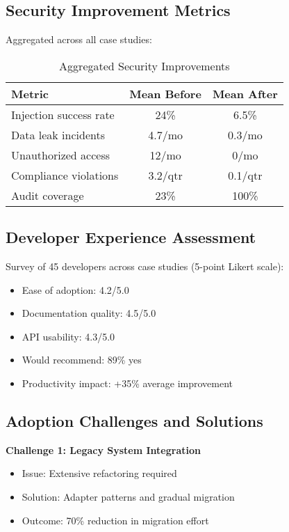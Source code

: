 \subsection{Security Improvement Metrics}

Aggregated across all case studies:

\begin{table}[h]
\centering
\caption{Aggregated Security Improvements}
\begin{tabular}{@{}lcc@{}}
\toprule
\textbf{Metric} & \textbf{Mean Before} & \textbf{Mean After} \\ \midrule
Injection success rate & 24\% & 6.5\% \\
Data leak incidents & 4.7/mo & 0.3/mo \\
Unauthorized access & 12/mo & 0/mo \\
Compliance violations & 3.2/qtr & 0.1/qtr \\
Audit coverage & 23\% & 100\% \\
\bottomrule
\end{tabular}
\end{table}

\subsection{Developer Experience Assessment}

Survey of 45 developers across case studies (5-point Likert scale):

\begin{itemize}
    \item Ease of adoption: 4.2/5.0
    \item Documentation quality: 4.5/5.0
    \item API usability: 4.3/5.0
    \item Would recommend: 89\% yes
    \item Productivity impact: +35\% average improvement
\end{itemize}

\subsection{Adoption Challenges and Solutions}

\textbf{Challenge 1: Legacy System Integration}
\begin{itemize}
    \item Issue: Extensive refactoring required
    \item Solution: Adapter patterns and gradual migration
    \item Outcome: 70\% reduction in migration effort
\end{itemize}

